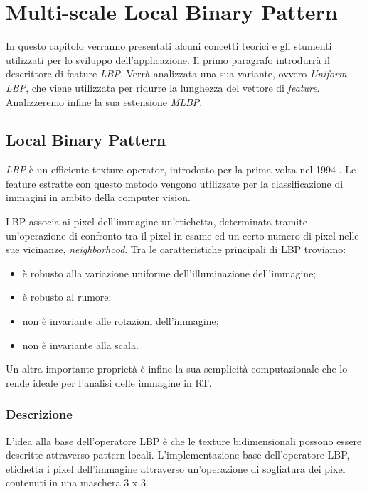 \section{Multi-scale Local Binary Pattern}
In questo capitolo verranno presentati alcuni concetti teorici e gli stumenti utilizzati per lo sviluppo dell'applicazione. Il primo paragrafo introdurrà il descrittore di feature \textit{\acf{LBP}}. Verrà analizzata una sua variante, ovvero \textit{Uniform LBP}, che viene utilizzata per ridurre la lunghezza del vettore di \textit{feature}. Analizzeremo infine la sua estensione \textit{\acf{MLBP}}.

\subsection{Local Binary Pattern}

\textit{\acf{LBP}} è un efficiente texture operator, introdotto per la prima volta nel 1994 \cite{LBPfirst}. Le feature estratte con questo metodo vengono utilizzate per la classificazione di immagini in ambito della computer vision.

\acs{LBP} associa ai pixel dell'immagine un'etichetta, determinata tramite un'operazione di confronto tra il pixel in esame ed un certo numero di pixel nelle sue vicinanze, \emph{neighborhood}.
Tra le caratteristiche principali di \acs{LBP} troviamo:

\begin{itemize}
	\item è robusto alla variazione uniforme dell'illuminazione dell'immagine;
	\item è robusto al rumore;
	\item non è invariante alle rotazioni dell'immagine;
	\item non è invariante alla scala.
\end{itemize}

Un altra importante proprietà è infine la sua semplicità computazionale che lo rende ideale per l'analisi delle immagine in \acf{RT}.

\subsubsection{Descrizione}

L'idea alla base dell'operatore \acf{LBP} è che le texture bidimensionali possono essere descritte attraverso pattern locali.
L'implementazione base dell'operatore \acs{LBP}, etichetta i pixel dell'immagine attraverso un'operazione di sogliatura dei pixel contenuti in una maschera 3 x 3.

